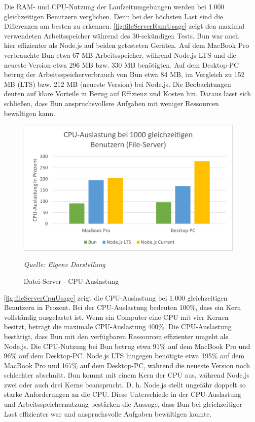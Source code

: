 \noindent
Die RAM- und CPU-Nutzung der Laufzeitumgebungen werden bei 1.000 gleichzeitigen Benutzern verglichen. Denn bei der höchsten Last sind die Differenzen am besten zu erkennen. \autoref{fig:fileServerRamUsage} zeigt den maximal verwendeten Arbeitsspeicher während des 30-sekündigen Tests. Bun war auch hier effizienter als Node.js auf beiden getesteten Geräten. Auf dem MacBook Pro verbrauchte Bun etwa 67 MB Arbeitsspeicher, während Node.js LTS und die neueste Version etwa 296 MB bzw. 330 MB benötigten. Auf dem Desktop-PC betrug der Arbeitsspeicherverbrauch von Bun etwa 84 MB, im Vergleich zu 152 MB (LTS) bzw. 212 MB (neueste Version) bei Node.js. Die Beobachtungen deuten auf klare Vorteile in Bezug auf Effizienz und Kosten hin. Daraus lässt sich schließen, dass Bun anspruchsvollere Aufgaben mit weniger Ressourcen bewältigen kann.\\

\begin{figure}[h!]
	\centering
	\includegraphics[width=\linewidth]{./images/fileServerCpuUsage.png}
	\caption{Datei-Server - CPU-Auslastung }
	\label{fig:fileServerCpuUsage}
	\textit{Quelle: Eigene Darstellung}
\end{figure}

\noindent
\autoref{fig:fileServerCpuUsage} zeigt die CPU-Auslastung bei 1.000 gleichzeitigen Benutzern in Prozent. Bei der CPU-Auslastung bedeuten 100\%, dass ein Kern vollständig ausgelastet ist. Wenn ein Computer eine CPU mit vier Kernen besitzt, beträgt die maximale CPU-Auslastung 400\%. Die CPU-Auslastung bestätigt, dass Bun mit den verfügbaren Ressourcen effizienter umgeht als Node.js. Die CPU-Nutzung bei Bun betrug etwa 91\% auf dem MacBook Pro und 96\% auf dem Desktop-PC. Node.js LTS hingegen benötigte etwa 195\% auf dem MacBook Pro und 167\% auf dem Desktop-PC, während die neueste Version noch schlechter abschnitt. Bun kommt mit einem Kern der CPU aus, während Node.js zwei oder auch drei Kerne beansprucht. D. h. Node.js stellt ungefähr doppelt so starke Anforderungen an die CPU. Diese Unterschiede in der CPU-Auslastung und Arbeitsspeichernutzung bestärken die Aussage, dass Bun bei gleichzeitiger Last effizienter war und anspruchsvolle Aufgaben bewältigen konnte.\\

